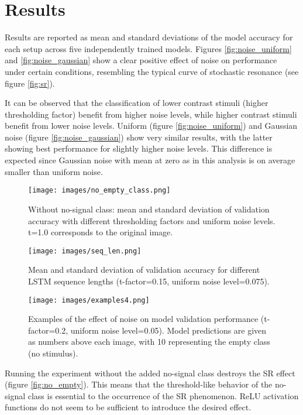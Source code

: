 \documentclass{article}
\begin{document}
\section{Results}
Results are reported as mean and standard deviations of the model accuracy for each setup across five independently trained models. Figures \ref{fig:noise_uniform} and \ref{fig:noise_gaussian} show a clear positive effect of noise on performance under certain conditions, resembling the typical curve of stochastic resonance (see figure \ref{fig:sr}).

It can be observed that the classification of lower contrast stimuli (higher thresholding factor) benefit from higher noise levels, while higher contrast stimuli benefit from lower noise levels. Uniform (figure \ref{fig:noise_uniform}) and Gaussian noise (figure \ref{fig:noise_gaussian}) show very similar results, with the latter showing best performance for slightly higher noise levels. This difference is expected since Gaussian noise with mean at zero as in this analysis is on average smaller than uniform noise.

\begin{figure}[thb]
\centering
\begin{minipage}{.475\textwidth}
    \centering
	\texttt{[image: images/no\_empty\_class.png]}
	\caption{Without no-signal class: mean and standard deviation of validation accuracy with different thresholding factors and uniform noise levels. t=1.0 corresponds to the original image.}
	\label{fig:no_empty}
	
    \centering
	\texttt{[image: images/seq\_len.png]}
	\caption{Mean and standard deviation of validation accuracy for different LSTM sequence lengths (t-factor=0.15, uniform noise level=0.075).}
	\label{fig:seq_len}
\end{minipage}
\hfill
\begin{minipage}{.475\textwidth}
    \centering
	\texttt{[image: images/examples4.png]}
	\caption{Examples of the effect of noise on model validation performance (t-factor=0.2, uniform noise level=0.05). Model predictions are given as numbers above each image, with 10 representing the empty class (no stimulus).}
	\label{fig:examples}
\end{minipage}
\end{figure}

Running the experiment without the added no-signal class destroys the SR effect (figure \ref{fig:no_empty}). This means that the threshold-like behavior of the no-signal class is essential to the occurrence of the SR phenomenon. ReLU activation functions do not seem to be sufficient to introduce the desired effect.
\end{document}
